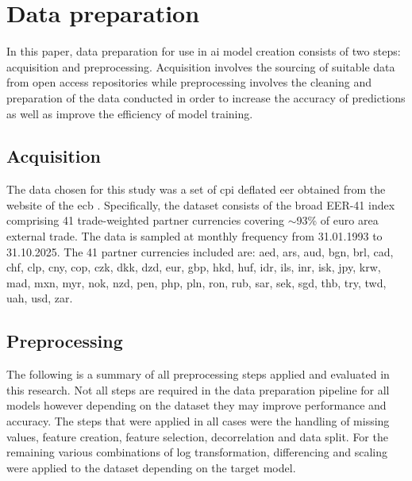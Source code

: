 \section{Data preparation}\label{Data preparation}

In this paper, data preparation for use in \gls{ai} model creation consists of two steps: acquisition and preprocessing. Acquisition involves the sourcing of suitable data from open access repositories while preprocessing involves the cleaning and preparation of the data conducted in order to increase the accuracy of predictions as well as improve the efficiency of model training.

\subsection{Acquisition}\label{Acquisition}

The data chosen for this study was a set of \gls{cpi} deflated \gls{eer} obtained from the website of the \gls{ecb} \cite{forex-data}. Specifically, the dataset consists of the broad EER-41 index comprising 41 trade-weighted partner currencies covering $\sim$93\% of euro area external trade. The data is sampled at monthly frequency from 31.01.1993 to 31.10.2025. The 41 partner currencies included are: \gls{aed}, \gls{ars}, \gls{aud}, \gls{bgn}, \gls{brl}, \gls{cad}, \gls{chf}, \gls{clp}, \gls{cny}, \gls{cop}, \gls{czk}, \gls{dkk}, \gls{dzd}, \gls{eur}, \gls{gbp}, \gls{hkd}, \gls{huf}, \gls{idr}, \gls{ils}, \gls{inr}, \gls{isk}, \gls{jpy}, \gls{krw}, \gls{mad}, \gls{mxn}, \gls{myr}, \gls{nok}, \gls{nzd}, \gls{pen}, \gls{php}, \gls{pln}, \gls{ron}, \gls{rub}, \gls{sar}, \gls{sek}, \gls{sgd}, \gls{thb}, \gls{try}, \gls{twd}, \gls{uah}, \gls{usd}, \gls{zar}.

\subsection{Preprocessing}\label{Preprocessing}

% 

The following is a summary of all preprocessing steps applied and evaluated in this research. Not all steps are required in the data preparation pipeline for all models however depending on the dataset they may improve performance and accuracy. The steps that were applied in all cases were the handling of missing values, feature creation, feature selection, decorrelation and data split. For the remaining various combinations of log transformation, differencing and scaling were applied to the dataset depending on the target model.

